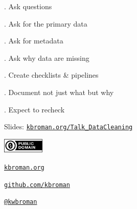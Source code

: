 \documentclass[aspectratio=169,12pt,t]{beamer}
\begin{document}
\begin{frame}{}

\hfill
\begin{minipage}[t]{0.9\textwidth}


\bbi
\princolorD
\item[\princolorD 14.] Ask questions
\item[\princolorD 15.] Ask for the primary data
\item[\princolorD 16.] Ask for metadata
\item[\princolorD 17.] Ask why data are missing
\ei

\end{minipage}

\note{
}
\end{frame}


\begin{frame}{}

\hfill
\begin{minipage}[t]{0.9\textwidth}


\bbi
\princolorE
\item[\princolorE 18.] Create checklists \& pipelines
\item[\princolorE 19.] Document not just what but why
\item[\princolorE 20.] Expect to recheck
\ei

\end{minipage}

\note{
}
\end{frame}



\begin{frame}[c]{}


\end{frame}



\begin{frame}[c]{}

\Large

Slides: \href{https://kbroman.org/Talk_DataCleaning}{\tt kbroman.org/Talk\_DataCleaning}

\vspace*{-7mm}
\hfill
\href{https://creativecommons.org/publicdomain/zero/1.0/}{\includegraphics[height=7mm]{Figs/cc-zero.png}}

\vspace{5mm}

\href{https://kbroman.org}{\tt \lolit kbroman.org}

\vspace{7mm}

\href{https://github.com/kbroman}{\tt \lolit github.com/kbroman}

\vspace{7mm}

\href{https://twitter.com/kwbroman}{\tt \lolit @kwbroman}

\note{
}

\end{frame}
\end{document}
